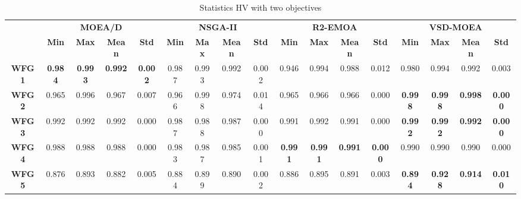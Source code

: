 \begin{table*}[t]
\caption{Statistics HV with two objectives}
\label{tab:StatisticsHV_2obj}
\centering
\begin{tabular}{cc|c|c|c|c|c|c|c|c|c|c|c|c|c|c|c}
\cline{2-17}
\textbf{}                           & \multicolumn{4}{c|}{\textbf{MOEA/D}}                              & \multicolumn{4}{c|}{\textbf{NSGA-II}}                             & \multicolumn{4}{c|}{\textbf{R2-EMOA}}                             & \multicolumn{4}{c|}{\textbf{VSD-MOEA}}                            \\ \cline{2-17} 
                                    & \textbf{Min}   & \textbf{Max}   & \textbf{Mean}  & \textbf{Std}   & \textbf{Min}   & \textbf{Max}   & \textbf{Mean}  & \textbf{Std}   & \textbf{Min}   & \textbf{Max}   & \textbf{Mean}  & \textbf{Std}   & \textbf{Min}   & \textbf{Max}   & \textbf{Mean}  & \textbf{Std}   \\ \hline
\multicolumn{1}{c|}{\textbf{WFG1}}  & \textbf{0.984} & \textbf{0.993} & \textbf{0.992} & \textbf{0.002} & 0.987          & 0.993          & 0.992          & 0.002          & 0.946          & 0.994          & 0.988          & 0.012          & 0.980          & 0.994          & 0.992          & 0.003          \\ \hline
\multicolumn{1}{c|}{\textbf{WFG2}}  & 0.965          & 0.996          & 0.967          & 0.007          & 0.966          & 0.998          & 0.974          & 0.014          & 0.965          & 0.966          & 0.966          & 0.000          & \textbf{0.998} & \textbf{0.998} & \textbf{0.998} & \textbf{0.000} \\ \hline
\multicolumn{1}{c|}{\textbf{WFG3}}  & 0.992          & 0.992          & 0.992          & 0.000          & 0.987          & 0.988          & 0.987          & 0.000          & 0.991          & 0.992          & 0.991          & 0.000          & \textbf{0.992} & \textbf{0.992} & \textbf{0.992} & \textbf{0.000} \\ \hline
\multicolumn{1}{c|}{\textbf{WFG4}}  & 0.988          & 0.988          & 0.988          & 0.000          & 0.983          & 0.987          & 0.985          & 0.001          & \textbf{0.991} & \textbf{0.991} & \textbf{0.991} & \textbf{0.000} & 0.990          & 0.990          & 0.990          & 0.000          \\ \hline
\multicolumn{1}{c|}{\textbf{WFG5}}  & 0.876          & 0.893          & 0.882          & 0.005          & 0.884          & 0.899          & 0.890          & 0.002          & 0.886          & 0.895          & 0.891          & 0.003          & \textbf{0.894} & \textbf{0.928} & \textbf{0.914} & \textbf{0.010} \\ \hline

\end{tabular}
\end{table*}
